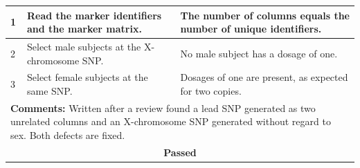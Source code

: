 \begin{table}[H]
\begin{tabular}{|llll|}
\multicolumn{1}{|l|}{1} & \multicolumn{1}{P{5.6cm}|}{Read the marker identifiers and the marker matrix.} & \multicolumn{2}{P{6.3cm}|}{The number of columns equals the number of unique identifiers.} \\ \hline
\multicolumn{1}{|l|}{2} & \multicolumn{1}{P{5.6cm}|}{Select male subjects at the X-chromosome SNP.} & \multicolumn{2}{P{6.3cm}|}{No male subject has a dosage of one.} \\ \hline
\multicolumn{1}{|l|}{3} & \multicolumn{1}{P{5.6cm}|}{Select female subjects at the same SNP.} & \multicolumn{2}{P{6.3cm}|}{Dosages of one are present, as expected for two copies.} \\ \hline
\multicolumn{4}{|P{15.2cm}|}{\textbf{Comments:} Written after a review found a lead SNP generated as two unrelated columns and an X-chromosome SNP generated without regard to sex. Both defects are fixed.} \\ \hline
\multicolumn{4}{|c|}{\textbf{Passed}} \\ \hline
\end{tabular}
\end{table}

